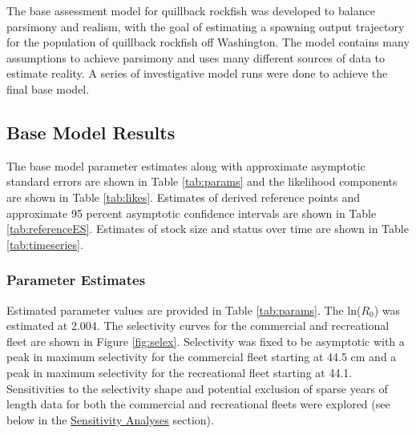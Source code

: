 \documentclass[11pt,
  english,
  letterpaper,
]{article}
\begin{document}

The base assessment model for quillback rockfish was developed to balance parsimony and realism, with the goal of estimating a spawning output trajectory for the population of quillback rockfish off Washington. The model contains many assumptions to achieve parsimony and uses many different sources of data to estimate reality. A series of investigative model runs were done to achieve the final base model.

\leavevmode\tagmcend\tagstructend\par


\hypertarget{base-model-results}{%
\subsection{Base Model Results}\label{base-model-results}}

\leavevmode\tagmcend\tagstructend


The base model parameter estimates along with approximate asymptotic standard errors are shown in Table \ref{tab:params} and the likelihood components are shown in Table \ref{tab:likes}. Estimates of derived reference points and approximate 95 percent asymptotic confidence intervals are shown in Table \ref{tab:referenceES}. Estimates of stock size and status over time are shown in Table \ref{tab:timeseries}.

\leavevmode\tagmcend\tagstructend\par


\hypertarget{parameter-estimates}{%
\subsubsection{Parameter Estimates}\label{parameter-estimates}}

\leavevmode\tagmcend\tagstructend


Estimated parameter values are provided in Table \ref{tab:params}. The ln({\(R_0\)\leavevmode\tagmcend\tagstructend}) was estimated at 2.004. The selectivity curves for the commercial and recreational fleet are shown in Figure \ref{fig:selex}. Selectivity was fixed to be asymptotic with a peak in maximum selectivity for the commercial fleet starting at 44.5 cm and a peak in maximum selectivity for the recreational fleet starting at 44.1. Sensitivities to the selectivity shape and potential exclusion of sparse years of length data for both the commercial and recreational fleets were explored (see below in the {\protect\hyperlink{sensitivity-analyses}{Sensitivity Analyses}\leavevmode\tagmcend\tagstructend} section).
\end{document}
